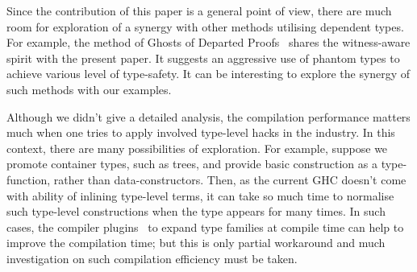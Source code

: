 \documentclass[demotion-paper.tex]{subfiles}
\begin{document}
Since the contribution of this paper is a general point of view, there are much room for exploration of a synergy with other methods utilising dependent types.
For example, the method of Ghosts of Departed Proofs~\cite{Noonan:2018aa} shares the witness-aware spirit with the present paper.
It suggests an aggressive use of phantom types to achieve various level of type-safety.
It can be interesting to explore the synergy of such methods with our examples.

Although we didn't give a detailed analysis, the compilation performance matters much when one tries to apply involved type-level hacks in the industry.
In this context, there are many possibilities of exploration.
For example, suppose we promote container types, such as trees, and provide basic construction as a type-function, rather than data-constructors.
Then, as the current GHC doesn't come with ability of inlining type-level terms, it can take so much time to normalise such type-level constructions when the type appears for many times.
In such cases, the compiler plugins~\cite{GHC-Team:2020aa} to expand type families at compile time can help to improve the compilation time; but this is only partial workaround and much investigation on such compilation efficiency must be taken.
\end{document}
